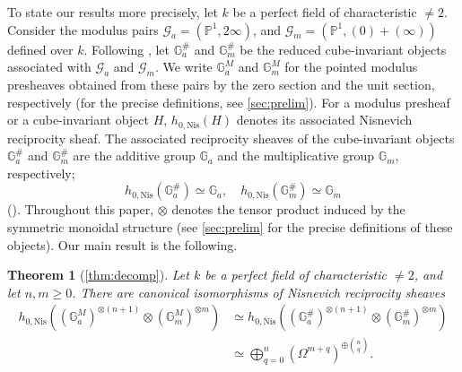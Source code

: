 \documentclass[a4paper,12pt,reqno]{amsart}
\numberwithin{equation}{section}
\newtheorem{thm}{Theorem}[section]
\theoremstyle{definition}
\newcommand{\bP}{\mathbb{P}}
\newcommand{\Gm}{\mathbb{G}_{m}}
\newcommand{\Ga}{\mathbb{G}_{a}}
\newcommand{\GaMod}{\mathbb{G}_{a}^{M}}
\newcommand{\GmMod}{\mathbb G_m^M}
\newcommand{\GaSharp}{\mathbb{G}_{a}^{\#}}
\newcommand{\GmSharp}{\mathbb G_m^{\#}}
\newcommand{\Nis}{\mathrm{Nis}}
\newcommand{\Gapair}{\mathcal{G}_a}
\newcommand{\Gmpair}{\mathcal{G}_m}
\begin{document}
To state our results more precisely, 
let $k$ be a perfect field of characteristic $\neq 2$. 
Consider the modulus pairs  
$\Gapair=(\bP^1,2\infty)$, and $\Gmpair=(\bP^1,(0)+(\infty))$ defined over $k$.
Following \cite[Section~5.1]{RSY22}, let
$\GaSharp$ and $\GmSharp$ be the reduced cube-invariant objects associated with
$\Gapair$ and $\Gmpair$.  We write $\GaMod$ and $\GmMod$ for the pointed
modulus presheaves obtained from these pairs by the zero section and
the unit section, respectively (for the precise definitions, see \autoref{sec:prelim}). 
For a modulus presheaf or a cube-invariant object
$H$, $h_{0,\Nis}(H)$ denotes its associated Nisnevich reciprocity sheaf.  
The  associated reciprocity sheaves of the cube-invariant objects $\GaSharp$ and $\GmSharp$ are 
the additive group $\Ga$ and the multiplicative group $\Gm$, respectively; 
\[
h_{0,\Nis}(\GaSharp) \simeq \Ga,\quad h_{0,\Nis}(\GmSharp) \simeq \Gm
\]
(\cite[Section~5.1]{RSY22}). 
Throughout this paper,
$\otimes$ denotes the tensor product induced by the symmetric monoidal
structure (see \autoref{sec:prelim} for the precise definitions of these objects).  
Our main result is the following.

\begin{thm}[{\autoref{thm:decomp}}]\label{thm:main}
Let $k$ be a perfect field of characteristic $\neq 2$, and let 
$n,m\geq 0$.
There are canonical isomorphisms of Nisnevich reciprocity sheaves
\begin{equation}\label{eq:maini}
 \begin{split}
 h_{0,\Nis}\left(
 (\GaMod)^{\otimes (n+1)}\otimes(\GmMod)^{\otimes m}
 \right)
 &\simeq
 h_{0,\Nis}\left(
 (\GaSharp)^{\otimes (n+1)}\otimes(\GmSharp)^{\otimes m}
 \right)\\
 &\simeq
 \bigoplus_{q=0}^{n}
 (\Omega^{m+q})^{\oplus\binom{n}{q}}.
 \end{split}
\end{equation}

\end{thm}
\end{document}
